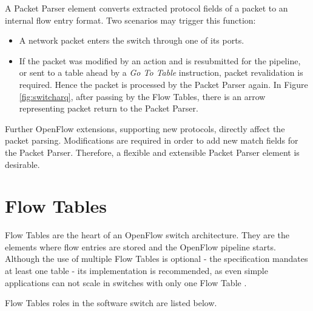 	A Packet Parser element converts extracted protocol fields of a packet to an internal flow entry format. Two scenarios may trigger this function:   

	\begin{itemize}

	\item A network packet enters the switch through one of its ports.    

	\item  If the packet was modified by an action and is resubmitted for the pipeline, or sent to a table ahead by a \textit{Go To Table} instruction, packet revalidation is required. Hence the packet is processed by the Packet Parser again. In Figure \ref{fig:switcharq}, after passing by the Flow Tables, there is an arrow representing packet return to the Packet Parser.        

	\end{itemize}

	Further OpenFlow extensions, supporting new protocols, directly affect the packet parsing. Modifications are required in order to add new match fields for the Packet Parser. Therefore, a flexible and extensible Packet Parser element is desirable.  

	\section{Flow Tables}

	Flow Tables are the heart of an OpenFlow switch architecture. They are the elements where flow entries are stored and the OpenFlow pipeline starts. Although the use of multiple Flow Tables is optional - the specification mandates at least one table - its implementation is recommended, as even simple applications can not scale in switches with only one Flow Table \cite{tableExplosion}.  
	
	Flow Tables roles in the software switch are listed below.

